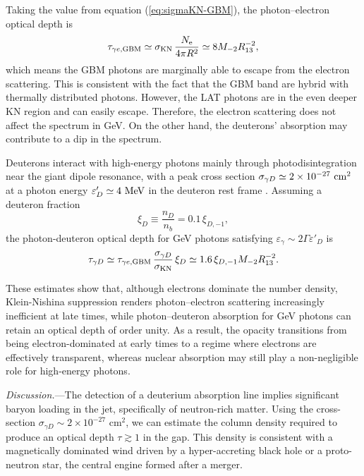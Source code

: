 \documentclass[aps,prl,twocolumn,superscriptaddress,showpacs,preprintnumbers,amsmath,amssymb,linenumbers]{revtex4-2}
\begin{document}
Taking the value from equation (\ref{eq:sigmaKN-GBM}), the photon--electron optical depth is
\begin{equation}
\tau_{\gamma e, \rm GBM}
\simeq
\sigma_{\rm KN} \, \frac{N_{\rm e}}{4 \pi R^2}
\simeq 
8 M_{-2} R_{13}^{-2},
\end{equation}
which means the GBM photons are marginally able to escape from the electron scattering. This is consistent with the fact that the GBM band are hybrid with thermally distributed photons. However, the LAT photons are in the even deeper KN region and can easily escape. Therefore, the electron scattering does not affect the spectrum in GeV. On the other hand, the deuterons' absorption may contribute to a dip in the spectrum.

Deuterons interact with high-energy photons mainly through photodisintegration near the giant dipole resonance, with a peak cross section
$\sigma_{\gamma D} \simeq 2 \times 10^{-27}\ {\rm cm^2}$ at a photon energy
$\varepsilon'_D \simeq 4~{\rm MeV}$ in the deuteron rest frame \cite{IAEA2000}.
Assuming a deuteron fraction
\begin{equation}
\xi_D \equiv \frac{n_D}{n_b} = 0.1\,\xi_{D,-1},
\end{equation}
the photon-deuteron optical depth for GeV photons satisfying
$\varepsilon_\gamma \sim 2\Gamma \varepsilon'_D$
is
\begin{equation}
\tau_{\gamma D}
\simeq
\tau_{\gamma e, \rm GBM} \, \frac{\sigma_{\gamma D}}{\sigma_{\rm KN}} \, \xi_D
\simeq 
1.6 \, \xi_{D,-1} M_{-2} R_{13}^{-2}.
\end{equation}

These estimates show that, although electrons dominate the number density, Klein-Nishina suppression renders photon--electron scattering increasingly inefficient at late times, while photon--deuteron absorption for GeV photons can retain an optical depth of order unity.
As a result, the opacity transitions from being electron-dominated at early times to a regime where electrons are effectively transparent, whereas nuclear absorption may still play a non-negligible role for high-energy photons.


\textit{Discussion.}---The detection of a deuterium absorption line implies significant baryon loading in the jet, specifically of neutron-rich matter. Using the cross-section $\sigma_{\gamma D} \sim 2 \times 10^{-27}$ cm$^2$, we can estimate the column density required to produce an optical depth $\tau \gtrsim 1$ in the gap. This density is consistent with a magnetically dominated wind driven by a hyper-accreting black hole or a proto-neutron star, the central engine formed after a merger.
\end{document}
